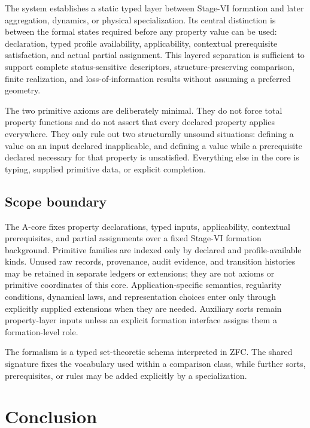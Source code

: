 \documentclass[11pt]{article}
\theoremstyle{definition}
\theoremstyle{remark}
\begin{document}
The system establishes a static typed layer between Stage-VI formation and later aggregation, dynamics, or physical specialization.
Its central distinction is between the formal states required before any property value can be used: declaration, typed profile availability, applicability, contextual prerequisite satisfaction, and actual partial assignment.
This layered separation is sufficient to support complete status-sensitive descriptors, structure-preserving comparison, finite realization, and loss-of-information results without assuming a preferred geometry.

The two primitive axioms are deliberately minimal.
They do not force total property functions and do not assert that every declared property applies everywhere.
They only rule out two structurally unsound situations: defining a value on an input declared inapplicable, and defining a value while a prerequisite declared necessary for that property is unsatisfied.
Everything else in the core is typing, supplied primitive data, or explicit completion.

\subsection{Scope boundary}

The A-core fixes property declarations, typed inputs, applicability, contextual prerequisites, and partial assignments over a fixed Stage-VI formation background. Primitive families are indexed only by declared and profile-available kinds. Unused raw records, provenance, audit evidence, and transition histories may be retained in separate ledgers or extensions; they are not axioms or primitive coordinates of this core.
Application-specific semantics, regularity conditions, dynamical laws, and representation choices enter only through explicitly supplied extensions when they are needed.
Auxiliary sorts remain property-layer inputs unless an explicit formation interface assigns them a formation-level role.

The formalism is a typed set-theoretic schema interpreted in ZFC.
The shared signature fixes the vocabulary used within a comparison class, while further sorts, prerequisites, or rules may be added explicitly by a specialization.

\section{Conclusion}
\label{sec:conclusion}
\end{document}

